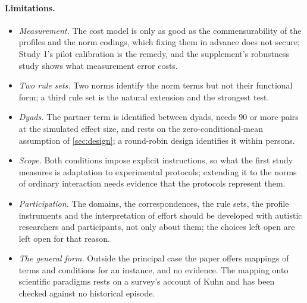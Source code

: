 \paragraph{Limitations.}
\begin{itemize}[leftmargin=*]
\item \emph{Measurement.} The cost model is only as good as the commensurability of the profiles and the norm codings, which fixing them in advance does not secure; Study 1's pilot calibration is the remedy, and the supplement's robustness study shows what measurement error costs.
\item \emph{Two rule sets.} Two norms identify the norm terms but not their functional form; a third rule set is the natural extension and the strongest test.
\item \emph{Dyads.} The partner term is identified between dyads, needs $90$ or more pairs at the simulated effect size, and rests on the zero-conditional-mean assumption of \autoref{sec:design}; a round-robin design identifies it within persons.
\item \emph{Scope.} Both conditions impose explicit instructions, so what the first study measures is adaptation to experimental protocols; extending it to the norms of ordinary interaction needs evidence that the protocols represent them.
\item \emph{Participation.} The domains, the correspondences, the rule sets, the profile instruments and the interpretation of effort should be developed with autistic researchers and participants, not only about them; the choices left open are left open for that reason.
\item \emph{The general form.} Outside the principal case the paper offers mappings of terms and conditions for an instance, and no evidence. The mapping onto scientific paradigms rests on a survey's account of Kuhn and has been checked against no historical episode.
\end{itemize}


